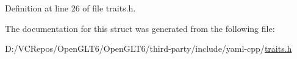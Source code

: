 Definition at line 26 of file traits.\+h.



The documentation for this struct was generated from the following file\+:\begin{DoxyCompactItemize}
\item 
D\+:/\+V\+C\+Repos/\+Open\+G\+L\+T6/\+Open\+G\+L\+T6/third-\/party/include/yaml-\/cpp/\mbox{\hyperlink{traits_8h}{traits.\+h}}\end{DoxyCompactItemize}
